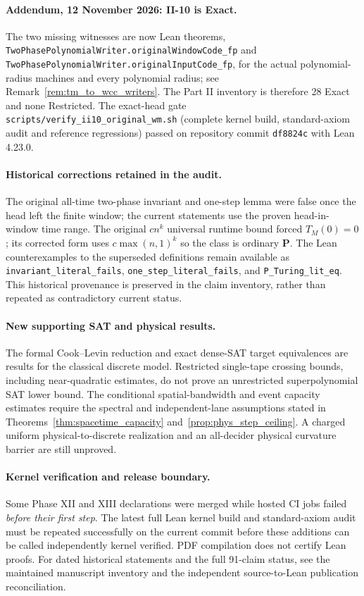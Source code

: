 \documentclass[12pt]{article}
\begin{document}
\paragraph{Addendum, 12 November 2026: II-10 is Exact.}
The two missing witnesses are now Lean theorems,
\nolinkurl{TwoPhasePolynomialWriter.originalWindowCode_fp} and
\nolinkurl{TwoPhasePolynomialWriter.originalInputCode_fp}, for the
actual polynomial-radius machines and every polynomial radius; see
Remark~\ref{rem:tm_to_wcc_writers}.  The Part II inventory is
therefore 28 Exact and none Restricted.  The exact-head gate
\texttt{scripts/verify\_ii10\_original\_wm.sh} (complete kernel
build, standard-axiom audit and reference regressions) passed on
repository commit \texttt{df8824c} with Lean 4.23.0.

\paragraph{Historical corrections retained in the audit.}
The original all-time two-phase invariant and
one-step lemma were false once the head left
the finite window; the current statements use
the proven head-in-window time range.
The original $c n^k$ universal runtime
bound forced $T_M(0)=0$; its corrected form
uses $c\max(n,1)^k$ so the class is ordinary
$\mathbf P$.  The Lean counterexamples to
the superseded definitions remain available
as \nolinkurl{invariant_literal_fails},
\nolinkurl{one_step_literal_fails}, and
\texttt{P\_Turing\_lit\_eq}.
This historical provenance is preserved
in the claim inventory, rather than
repeated as contradictory current status.

\paragraph{New supporting SAT and physical results.}
The formal Cook--Levin reduction and exact
dense-SAT target equivalences are results for
the classical discrete model.  Restricted
single-tape crossing bounds, including
near-quadratic estimates, do not prove
an unrestricted superpolynomial SAT lower bound.
The conditional spatial-bandwidth and event
capacity estimates require the spectral and
independent-lane assumptions stated in
Theorems~\ref{thm:spacetime_capacity}
and~\ref{prop:phys_step_ceiling}.
A charged uniform physical-to-discrete
realization and an all-decider physical
curvature barrier are still unproved.

\paragraph{Kernel verification and release boundary.}
Some Phase XII and XIII declarations were merged
while hosted CI jobs failed \emph{before their
first step}.  The latest full Lean kernel build
and standard-axiom audit must be repeated
successfully on the current commit before
these additions can be called independently
kernel verified.  PDF compilation does
not certify Lean proofs.  For dated
historical statements and the full
91-claim status, see the maintained
manuscript inventory and the independent
source-to-Lean publication reconciliation.
\end{document}
